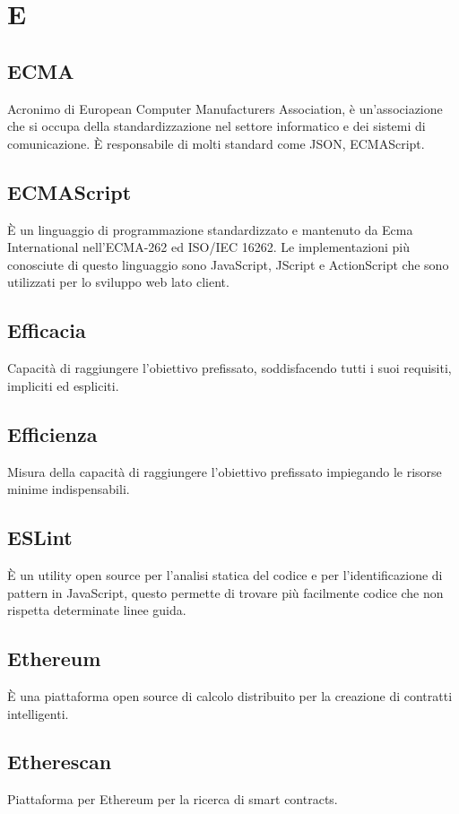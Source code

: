 \section*{E}

\subsection{ECMA}
Acronimo di European Computer Manufacturers Association, è un'associazione che si occupa della standardizzazione nel settore informatico e dei sistemi di comunicazione. È responsabile di molti standard come JSON, ECMAScript.

\subsection{ECMAScript}
È un linguaggio di programmazione standardizzato e mantenuto da Ecma International nell'ECMA-262 ed ISO/IEC 16262. Le implementazioni più conosciute di questo linguaggio sono JavaScript, JScript e ActionScript che sono utilizzati per lo sviluppo web lato client.

\subsection{Efficacia}
Capacità di raggiungere l'obiettivo prefissato, soddisfacendo tutti i suoi requisiti, impliciti ed espliciti.

\subsection{Efficienza}
Misura della capacità di raggiungere l'obiettivo prefissato impiegando le risorse minime indispensabili.

\subsection{ESLint}
È un utility open source per l’analisi statica del codice e per l’identificazione di pattern in JavaScript,  questo permette di trovare più facilmente codice che non rispetta determinate linee guida.

\subsection{Ethereum}
È una piattaforma open source di calcolo distribuito per la creazione di contratti intelligenti.

\subsection{Etherescan}
Piattaforma per Ethereum per la ricerca di smart contracts.